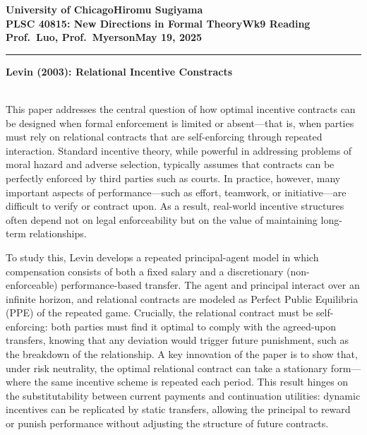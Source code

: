 \documentclass[10pt]{article}    %
\newcommand{\myname}{Hiromu Sugiyama}
\newcommand{\assignment}{Wk9 Reading}
\newcommand{\duedate}{May 19, 2025}
\begin{document}
\textbf{University of Chicago}\hfill\textbf{\myname}\\[0.01in]
\textbf{PLSC 40815: New Directions in Formal Theory}\hfill\textbf{\assignment}\\[0.01in]
\textbf{Prof.\ Luo, Prof.\ Myerson}\hfill\textbf{\duedate}\\
\smallskip\hrule\bigskip

\textbf{Levin (2003): Relational Incentive Constracts} \par
\\
This paper addresses the central question of how optimal incentive contracts can be designed when formal enforcement is limited or absent—that is, when parties must rely on relational contracts that are self-enforcing through repeated interaction. Standard incentive theory, while powerful in addressing problems of moral hazard and adverse selection, typically assumes that contracts can be perfectly enforced by third parties such as courts. In practice, however, many important aspects of performance—such as effort, teamwork, or initiative—are difficult to verify or contract upon. As a result, real-world incentive structures often depend not on legal enforceability but on the value of maintaining long-term relationships.

To study this, Levin develops a repeated principal-agent model in which compensation consists of both a fixed salary and a discretionary (non-enforceable) performance-based transfer. The agent and principal interact over an infinite horizon, and relational contracts are modeled as Perfect Public Equilibria (PPE) of the repeated game. Crucially, the relational contract must be self-enforcing: both parties must find it optimal to comply with the agreed-upon transfers, knowing that any deviation would trigger future punishment, such as the breakdown of the relationship. A key innovation of the paper is to show that, under risk neutrality, the optimal relational contract can take a stationary form—where the same incentive scheme is repeated each period. This result hinges on the substitutability between current payments and continuation utilities: dynamic incentives can be replicated by static transfers, allowing the principal to reward or punish performance without adjusting the structure of future contracts.
\end{document}
